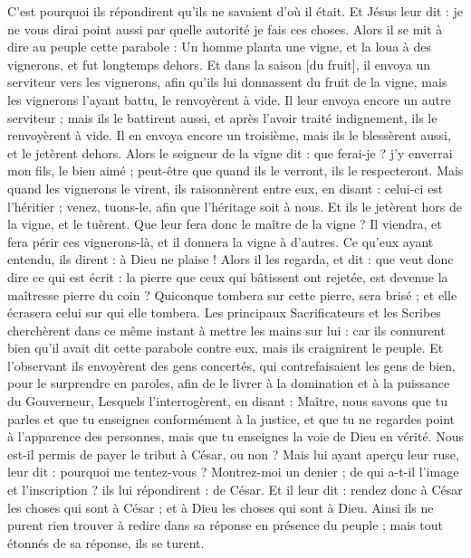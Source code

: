 \begin{multicols}{2}
C'est pourquoi ils répondirent qu'ils ne savaient d'où il était.
Et Jésus leur dit : je ne vous dirai point aussi par quelle autorité je fais ces choses.
Alors il se mit à dire au peuple cette parabole : Un homme planta une vigne, et la loua à des vignerons, et fut longtemps dehors.
Et dans la saison [du fruit], il envoya un serviteur vers les vignerons, afin qu'ils lui donnassent du fruit de la vigne, mais les vignerons l'ayant battu, le renvoyèrent à vide.
Il leur envoya encore un autre serviteur ; mais ils le battirent aussi, et après l'avoir traité indignement, ils le renvoyèrent à vide.
Il en envoya encore un troisième, mais ils le blessèrent aussi, et le jetèrent dehors.
Alors le seigneur de la vigne dit : que ferai-je ? j'y enverrai mon fils, le bien aimé ; peut-être que quand ils le verront, ils le respecteront.
Mais quand les vignerons le virent, ils raisonnèrent entre eux, en disant : celui-ci est l'héritier ; venez, tuons-le, afin que l'héritage soit à nous.
Et ils le jetèrent hors de la vigne, et le tuèrent. Que leur fera donc le maître de la vigne ?
Il viendra, et fera périr ces vignerons-là, et il donnera la vigne à d'autres. Ce qu'eux ayant entendu, ils dirent : à Dieu ne plaise !
Alors il les regarda, et dit : que veut donc dire ce qui est écrit : la pierre que ceux qui bâtissent ont rejetée, est devenue la maîtresse pierre du coin ?
Quiconque tombera sur cette pierre, sera brisé ; et elle écrasera celui sur qui elle tombera.
Les principaux Sacrificateurs et les Scribes cherchèrent dans ce même instant à mettre les mains sur lui : car ils connurent bien qu'il avait dit cette parabole contre eux, mais ils craignirent le peuple.
Et l'observant ils envoyèrent des gens concertés, qui contrefaisaient les gens de bien, pour le surprendre en paroles, afin de le livrer à la domination et à la puissance du Gouverneur,
Lesquels l'interrogèrent, en disant : Maître, nous savons que tu parles et que tu enseignes conformément à la justice, et que tu ne regardes point à l'apparence des personnes, mais que tu enseignes la voie de Dieu en vérité.
Nous est-il permis de payer le tribut à César, ou non ?
Mais lui ayant aperçu leur ruse, leur dit : pourquoi me tentez-vous ?
Montrez-moi un denier ; de qui a-t-il l'image et l'inscription ? ils lui répondirent : de César.
Et il leur dit : rendez donc à César les choses qui sont à César ; et à Dieu les choses qui sont à Dieu.
Ainsi ils ne purent rien trouver à redire dans sa réponse en présence du peuple ; mais tout étonnés de sa réponse, ils se turent.

\end{multicols}
